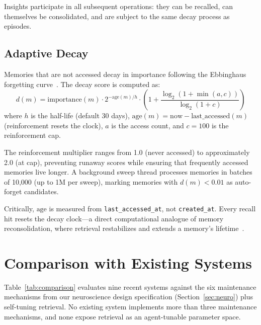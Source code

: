 \documentclass{article}
\begin{document}
Insights participate in all subsequent operations: they can be recalled, can themselves be consolidated, and are subject to the same decay process as episodes.

\subsection{Adaptive Decay}
\label{sec:decay}

Memories that are not accessed decay in importance following the Ebbinghaus forgetting curve~\citep{ebbinghaus1885}. The decay score is computed as:
\begin{equation}
    d(m) = \text{importance}(m) \cdot 2^{-\text{age}(m) / h} \cdot \left(1 + \frac{\log_2(1 + \min(a, c))}{\log_2(1 + c)}\right)
    \label{eq:decay}
\end{equation}
where $h$ is the half-life (default 30 days), $\text{age}(m) = \text{now} - \text{last\_accessed}(m)$ (reinforcement resets the clock), $a$ is the access count, and $c = 100$ is the reinforcement cap.

The reinforcement multiplier ranges from 1.0 (never accessed) to approximately 2.0 (at cap), preventing runaway scores while ensuring that frequently accessed memories live longer. A background sweep thread processes memories in batches of 10{,}000 (up to 1M per sweep), marking memories with $d(m) < 0.01$ as auto-forget candidates.

Critically, $\text{age}$ is measured from \texttt{last\_accessed\_at}, not \texttt{created\_at}. Every recall hit resets the decay clock---a direct computational analogue of memory reconsolidation, where retrieval restabilizes and extends a memory's lifetime~\citep{nader2000}.

\section{Comparison with Existing Systems}
\label{sec:comparison}

Table~\ref{tab:comparison} evaluates nine recent systems against the six maintenance mechanisms from our neuroscience design specification (Section~\ref{sec:neuro}) plus self-tuning retrieval. No existing system implements more than three maintenance mechanisms, and none expose retrieval as an agent-tunable parameter space.
\end{document}
